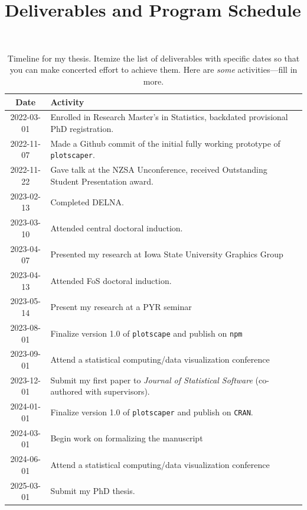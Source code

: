 \documentclass[12pt,a4paper]{article}
\begin{document}
\section{Deliverables and Program Schedule}
\label{sec:timeline}




\begin{table}[hh]
\caption{
Timeline for my thesis.
Itemize the list of deliverables with specific dates so that
you can make concerted effort to achieve them.
Here are \textit{some} activities---fill in more.
}
\centering
\ ~~~~ \\
\label{tab:timeline}
\begin{tabular}{|c|l|}
\hline
Date & Activity \\
\hline
2022-03-01 & Enrolled in Research Master's in Statistics, backdated provisional PhD registration. \\
2022-11-07 & Made a Github commit of the initial fully working prototype of \texttt{plotscaper}. \\
2022-11-22 & Gave talk at the NZSA Unconference, received Outstanding Student Presentation award. \\
2023-02-13 & Completed DELNA. \\
2023-03-10 & Attended central doctoral induction. \\
2023-04-07 & Presented my research at Iowa State University Graphics Group \\
2023-04-13 & Attended FoS doctoral induction. \\
2023-05-14 & Present my research at a PYR seminar \\
2023-08-01 & Finalize version 1.0 of \texttt{plotscape} and publish on \texttt{npm} \\
2023-09-01 & Attend a statistical computing/data visualization conference \\
2023-12-01 & Submit my first paper to \textit{Journal of Statistical Software} (co-authored with supervisors). \\
2024-01-01 & Finalize version 1.0 of \texttt{plotscaper} and publish on \texttt{CRAN}. \\
2024-03-01 & Begin work on formalizing the manuscript \\
2024-06-01 & Attend a statistical computing/data visualization conference \\
2025-03-01 & Submit my PhD thesis. \\
\hline
\end{tabular}
\end{table}
\end{document}
